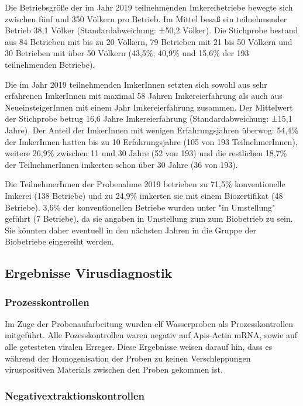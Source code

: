 Die Betriebsgröße der im Jahr 2019 teilnehmenden Imkereibetriebe bewegte sich zwischen fünf und 350 Völkern pro Betrieb. Im Mittel besaß ein teilnehmender Betrieb 38,1 Völker (Standardabweichung: ±50,2 Völker). Die Stichprobe bestand aus 84 Betrieben mit bis zu 20 Völkern, 79 Betrieben mit 21 bis 50 Völkern und 30 Betrieben mit über 50 Völkern (43,5\%; 40,9\% und 15,6\% der 193 teilnehmenden Betriebe).

Die im Jahr 2019 teilnehmenden ImkerInnen setzten sich sowohl aus sehr erfahrenen ImkerInnen mit maximal 58 Jahren Imkereierfahrung als auch aus NeueinsteigerInnen mit einem Jahr Imkereierfahrung zusammen. Der Mittelwert der Stichprobe betrug 16,6 Jahre Imkereierfahrung (Standardabweichung: ±15,1 Jahre). Der Anteil der ImkerInnen mit wenigen Erfahrungsjahren überwog: 54,4\% der ImkerInnen hatten bis zu 10 Erfahrungsjahre (105 von 193 TeilnehmerInnen), weitere 26,9\% zwischen 11 und 30 Jahre (52 von 193) und die restlichen 18,7\% der TeilnehmerInnen imkerten schon über 30 Jahre (36 von 193). 

Die TeilnehmerInnen der Probenahme 2019 betrieben zu 71,5\% konventionelle Imkerei (138 Betriebe) und zu 24,9\% imkerten sie mit einem Biozertifikat (48 Betriebe). 3,6\% der konventionellen Betriebe wurden unter "in Umstellung" geführt (7 Betriebe), da sie angaben in Umstellung zum zum Biobetrieb zu sein. Sie könnten daher eventuell in den nächsten Jahren in die Gruppe der Biobetriebe eingereiht werden.

\subsection{Ergebnisse Virusdiagnostik}

\subsubsection{Prozesskontrollen}
\label{chap:prozesskontrollen}

Im Zuge der Probenaufarbeitung wurden elf Wasserproben als Prozesskontrollen mitgeführt. Alle Pozesskontrollen waren negativ auf Apis-Actin mRNA, sowie auf alle getesteten viralen Erreger. Diese Ergebnisse weisen darauf hin, dass es während der Homogenisation der Proben zu keinen Verschleppungen viruspositiven Materials zwischen den Proben gekommen ist.

\subsubsection{Negativextraktionskontrollen}
\label{chap:negativkontrollen}

